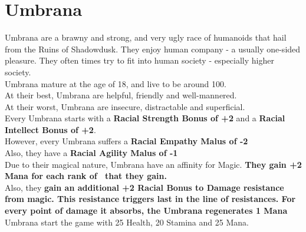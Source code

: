 \section{Umbrana}\label{race:umbrana}
Umbrana are a brawny and strong, and very ugly race of humanoids that hail from the Ruins of Shadowdusk.
They enjoy human company - a usually one-sided pleasure.
They often times try to fit into human society - especially higher society.\\
Umbrana mature at the age of 18, and live to be around 100.\\
At their best, Umbrana are helpful, friendly and well-mannered.\\
At their worst, Umbrana are insecure, distractable and superficial.\\
Every Umbrana starts with a \textbf{Racial Strength Bonus of +2} and a \textbf{Racial Intellect Bonus of +2}.\\
However, every Umbrana suffers a \textbf{Racial Empathy Malus of -2}\\
Also, they have a \textbf{Racial Agility Malus of -1}\\
Due to their magical nature, Umbrana have an affinity for Magic. \textbf{They gain +2 Mana for each rank of~ that they gain.}\\
Also, they \textbf{gain an additional +2 Racial Bonus to Damage resistance from magic.
This resistance triggers last in the line of resistances.
For every point of damage it absorbs, the Umbrana regenerates 1 Mana}\\
Umbrana start the game with 25 Health, 20 Stamina and 25 Mana.